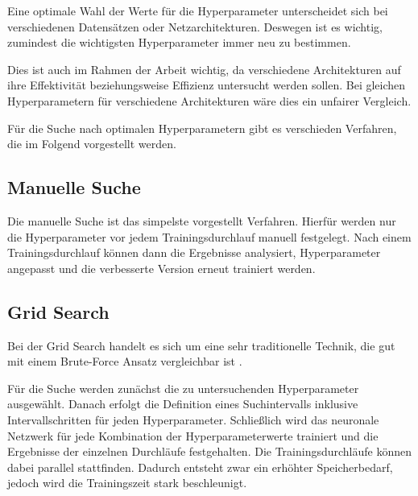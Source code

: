 
Eine optimale Wahl der Werte für die Hyperparameter unterscheidet sich bei verschiedenen Datensätzen oder Netzarchitekturen. 
Deswegen ist es wichtig, zumindest die wichtigsten Hyperparameter immer neu zu bestimmen.

Dies ist auch im Rahmen der Arbeit wichtig, da verschiedene Architekturen auf ihre Effektivität beziehungsweise Effizienz  untersucht werden sollen.
Bei gleichen Hyperparametern für verschiedene Architekturen wäre dies ein unfairer Vergleich.

Für die Suche nach optimalen Hyperparametern gibt es verschieden Verfahren, die im Folgend vorgestellt werden.

\subsection{Manuelle Suche}
Die manuelle Suche ist das simpelste vorgestellt Verfahren.
Hierfür werden nur die Hyperparameter vor jedem Trainingsdurchlauf manuell festgelegt.
Nach einem Trainingsdurchlauf können dann die Ergebnisse analysiert, Hyperparameter angepasst und die verbesserte Version erneut trainiert werden.


\subsection{Grid Search}
Bei der Grid Search handelt es sich um eine sehr traditionelle Technik, die gut mit einem Brute-Force Ansatz vergleichbar ist \cite{hyperparameters-grid-search}.
\newline

Für die Suche werden zunächst die zu untersuchenden Hyperparameter ausgewählt.
Danach erfolgt die Definition eines Suchintervalls inklusive Intervallschritten für jeden Hyperparameter.
Schließlich wird das neuronale Netzwerk für jede Kombination der Hyperparameterwerte trainiert und die Ergebnisse der einzelnen Durchläufe festgehalten.
Die Trainingsdurchläufe können dabei parallel stattfinden.
Dadurch entsteht zwar ein erhöhter Speicherbedarf, jedoch wird die Trainingszeit stark beschleunigt.

